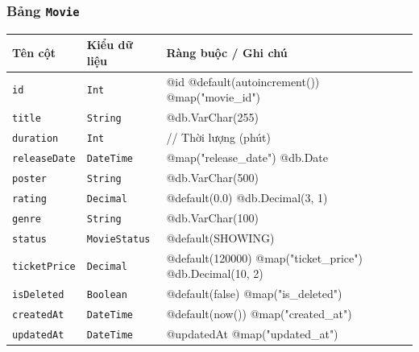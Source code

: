 \subsubsection{Bảng \texttt{Movie}}
\begin{longtable}{|p{3.6cm}|p{3.0cm}|p{8.9cm}|}
\hline
\rowcolor{headerblue} \textbf{Tên cột} & \textbf{Kiểu dữ liệu} & \textbf{Ràng buộc / Ghi chú} \\ \hline
\endhead
\texttt{id} & \texttt{Int} & \small @id @default(autoincrement()) @map("movie\_id") \\ \hline
\texttt{title} & \texttt{String} & \small @db.VarChar(255) \\ \hline
\texttt{duration} & \texttt{Int} & \small // Thời lượng (phút) \\ \hline
\texttt{releaseDate} & \texttt{DateTime} & \small @map("release\_date") @db.Date \\ \hline
\texttt{poster} & \texttt{String} & \small @db.VarChar(500) \\ \hline
\texttt{rating} & \texttt{Decimal} & \small @default(0.0) @db.Decimal(3, 1) \\ \hline
\texttt{genre} & \texttt{String} & \small @db.VarChar(100) \\ \hline
\texttt{status} & \texttt{MovieStatus} & \small @default(SHOWING) \\ \hline
\texttt{ticketPrice} & \texttt{Decimal} & \small @default(120000) @map("ticket\_price") @db.Decimal(10, 2) \\ \hline
\texttt{isDeleted} & \texttt{Boolean} & \small @default(false) @map("is\_deleted") \\ \hline
\texttt{createdAt} & \texttt{DateTime} & \small @default(now()) @map("created\_at") \\ \hline
\texttt{updatedAt} & \texttt{DateTime} & \small @updatedAt @map("updated\_at") \\ \hline
\end{longtable}

